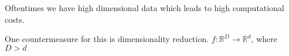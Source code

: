 Oftentimes we have high dimensional data which leads to high computational costs. 

One countermeasure for this is dimensionality reduction. $f: \mathbb{R}^D \rightarrow \mathbb{R}^d$, where $D > d$


